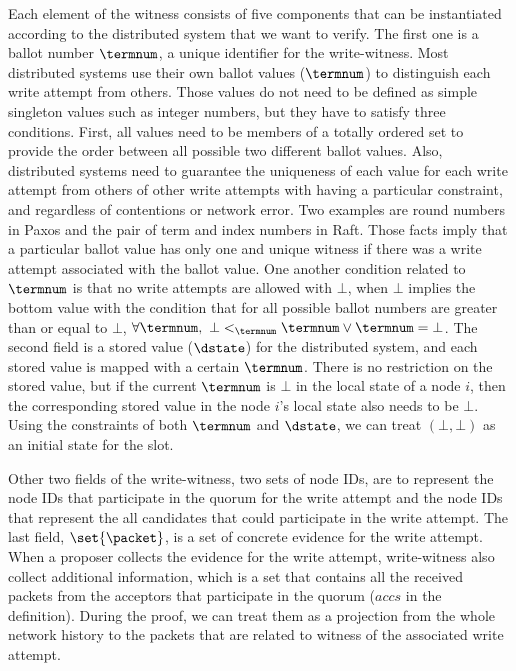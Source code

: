 Each element of the witness consists of five components that can be instantiated according to the distributed system that we want to verify.
The first one is a ballot number $\termnum$, a unique identifier for the write-witness.
Most distributed systems use their own ballot values ($\termnum$) to distinguish each write attempt from others. 
Those values do not need to be defined as simple singleton values such as integer numbers, but they have to satisfy three conditions. 
First, all values need to be members of a totally ordered set to provide the order 
between all possible two different ballot values.
Also, distributed systems need to guarantee the uniqueness of each value for each write attempt from others of other write attempts
with having a particular constraint, and regardless of contentions or network error.
Two examples are round numbers in Paxos and the pair of term and index numbers in Raft.
Those facts imply that a particular ballot value has only one and unique witness if there was a write attempt associated with the ballot value.
One another condition related to $\termnum$ is that no write attempts are allowed with $\bot$, 
when $\bot$ implies the bottom value with the condition that for all possible ballot numbers are greater than or equal to $\bot$, 
 $\forall \termnum, \ \bot <_{\termnum} \termnum \vee \termnum = \bot$.
The second field is a stored value ($\dstate$) for the distributed system, and each stored value is mapped with a certain $\termnum$.
There is no restriction on the stored value, but if the current $\termnum$ is $\bot$ in the local state of a node $i$, 
 then the corresponding stored value in the node $i$'s local state also needs to be $\bot$.
Using the constraints of both $\termnum$ and $\dstate$, we can treat $(\bot, \bot)$ as an initial state for the slot. 

Other two fields of the write-witness, two sets of node IDs, are to 
represent the node IDs that participate in the quorum for the write attempt and
the node IDs that represent the all candidates that could participate in the write attempt.
The last field, $\set{\packet}$, is a set of concrete evidence for the write attempt. 
When a proposer collects the evidence for the write attempt, 
write-witness also collect additional information, which is a set that contains all the received packets from the acceptors that participate in the quorum ($accs$ in the definition).
During the proof, we can treat them as a projection from the whole network history to the packets that are related to witness of the associated write attempt. 

